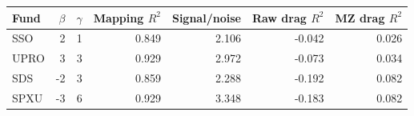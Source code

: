 \begin{tabular}{lrrrrrr}
\toprule
Fund & $\beta$ & $\gamma$ & Mapping $R^2$ & Signal/noise & Raw drag $R^2$ & MZ drag $R^2$ \\
\midrule
SSO & 2 & 1 & 0.849 & 2.106 & -0.042 & 0.026 \\
UPRO & 3 & 3 & 0.929 & 2.972 & -0.073 & 0.034 \\
SDS & -2 & 3 & 0.859 & 2.288 & -0.192 & 0.082 \\
SPXU & -3 & 6 & 0.929 & 3.348 & -0.183 & 0.082 \\
\bottomrule
\end{tabular}
